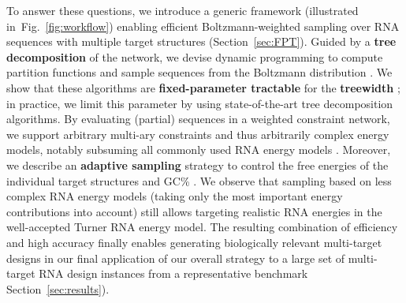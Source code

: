 \documentclass{bioinfo}
\newcommand{\Def}[1]{{\bfseries #1}}
\newcommand{\Nuc}[1]{{\sf #1}}
\newcommand{\Cb}{\Nuc{C}}
\newcommand{\Gb}{\Nuc{G}}
\newcommand{\GCb}{\Gb\Cb}
\begin{document}
To answer these questions, we introduce a generic framework (illustrated in~Fig.~\ref{fig:workflow}) enabling efficient Boltzmann-weighted sampling over RNA sequences with multiple target structures (Section~\ref{sec:FPT}). Guided by a \Def{tree decomposition} of the network, we devise dynamic programming to compute partition functions and sample sequences from the Boltzmann distribution%
. We show that these algorithms are \Def{fixed-parameter tractable} for the \Def{treewidth}%
%
; in practice, we limit this parameter by using state-of-the-art tree decomposition algorithms.
By evaluating (partial) sequences in a weighted constraint
network, we support arbitrary multi-ary constraints and thus
arbitrarily complex energy models,
notably subsuming all commonly
used RNA energy models%
.  Moreover, we describe an \Def{adaptive
  sampling} strategy to control the free energies of the individual
target structures and \GCb\%%
. %
We observe that sampling based on less complex RNA energy models
(taking only the most important energy contributions into account)
still allows targeting realistic RNA energies in the well-accepted
Turner RNA energy model. The resulting combination of efficiency and
high accuracy finally enables generating biologically relevant
multi-target designs in our final application of our overall strategy
to a large set of multi-target RNA design instances from a
representative benchmark Section~\ref{sec:results}).

\end{document}
